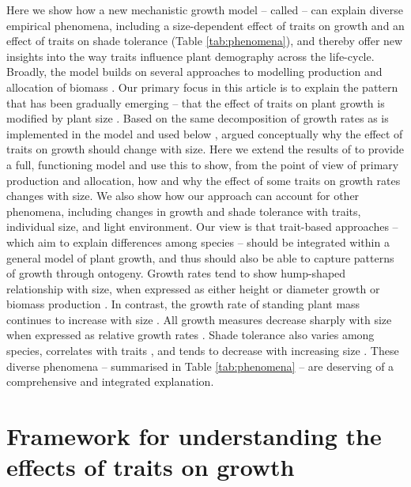 \documentclass[a4paper,11pt]{article}
\begin{document}
Here we show how a new mechanistic growth model -- called {\plant} \citep{Falster-2016} -- can explain diverse empirical phenomena, including a size-dependent effect of traits on growth and an effect of traits on shade tolerance (Table \ref{tab:phenomena}), and thereby offer new insights into the way traits influence plant demography across the life-cycle. Broadly, the {\plant} model builds on several approaches to modelling production and allocation of biomass \citep[e.g.][]{Givnish-1988, Yokozawa-1995,Makela-1997, Moorcroft-2001, Sitch-2008, Falster-2011, King-2011}. Our primary focus in this article is to explain the pattern that has been gradually emerging -- that the effect of traits on plant growth is modified by plant size \citep{Ruger-2012, Iida-2014, Gibert-2016}. Based on the same decomposition of growth rates as is implemented in the {\plant} model and used below \citep[from][]{Falster-2011}, \citet{Gibert-2016} argued conceptually why the effect of traits on growth should change with size. Here we extend the results of \citet{Gibert-2016} to provide a full, functioning model and use this to show, from the point of view of primary production and allocation, how and why the effect of some traits on growth rates changes with size. We also show how our approach can account for other phenomena, including changes in growth and shade tolerance with traits, individual size, and light environment. Our view is that trait-based approaches -- which aim to explain differences among species -- should be integrated within a general model of plant growth, and thus should also be able to capture patterns of growth through ontogeny. Growth rates tend to show hump-shaped relationship with size, when expressed as either height \citep{Sillett-2010, King-2011} or diameter growth \citep{Canham-2004, Canham-2006, Herault-2011} or biomass production \citep{Givnish-1988, Koch-2004}. In contrast, the growth rate of standing plant mass continues to increase with size \citep{Sillett-2010, Stephenson-2014}. All growth measures decrease sharply with size when expressed as relative growth rates \citep{Rees-2010, Iida-2014}. Shade tolerance also varies among species, correlates with traits \citep{Messier-1999, Lusk-2008, Poorter-2006}, and tends to decrease with increasing size \citep{Givnish-1988, Kneeshaw-2006, Lusk-2008}. These diverse phenomena -- summarised in Table \ref{tab:phenomena} -- are deserving of a comprehensive and integrated explanation.

\section{Framework for understanding the effects of traits on growth}
\end{document}
